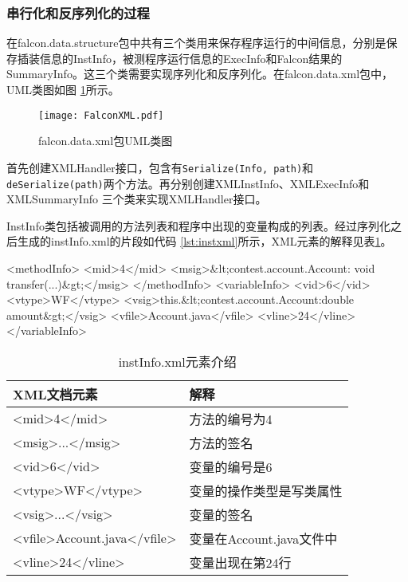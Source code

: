 \subsubsection{串行化和反序列化的过程}
在falcon.data.structure包中共有三个类用来保存程序运行的中间信息，分别是保存插装信息的InstInfo，被测程序运行信息的ExecInfo和Falcon结果的SummaryInfo。这三个类需要实现序列化和反序列化。在falcon.data.xml包中，UML类图如图
\ref{pic:FalconXML}所示。
\begin{figure}[!ht]
  \centering
  \texttt{[image: FalconXML.pdf]}\\
  \caption{falcon.data.xml包UML类图}\label{pic:FalconXML}
\end{figure}
首先创建XMLHandler接口，包含有\texttt{Serialize(Info, path)}和\texttt{deSerialize(path)}两个方法。再分别创建XMLInstInfo、XMLExecInfo和XMLSummaryInfo 三个类来实现XMLHandler接口。\par
InstInfo类包括被调用的方法列表和程序中出现的变量构成的列表。经过序列化之后生成的instInfo.xml的片段如代码
\ref{lst:instxml}所示，XML元素的解释见表\ref{tab:instXMLele}。\\
\begin{code}[language=XML, label=lst:instxml, caption=instInfo.xml片段]
<methodInfo>
 <mid>4</mid>
 <msig>&lt;contest.account.Account: void transfer(...)&gt;</msig>
</methodInfo>
<variableInfo>
 <vid>6</vid>
 <vtype>WF</vtype>
 <vsig>this.&lt;contest.account.Account:double amount&gt;</vsig>
 <vfile>Account.java</vfile>
 <vline>24</vline>
</variableInfo>
\end{code}
\begin{table}[!ht]
    \centering
    \caption{instInfo.xml元素介绍}\label{tab:instXMLele}
    \begin{tabular}{|l|l|}
      \hline
       XML文档元素 & 解释\\\hline
       <mid>4</mid> & 方法的编号为4\\\hline
       <msig>...</msig> & 方法的签名\\\hline
       <vid>6</vid> & 变量的编号是6\\\hline
       <vtype>WF</vtype> & 变量的操作类型是写类属性\\\hline
       <vsig>...</vsig> & 变量的签名\\\hline
       <vfile>Account.java</vfile> & 变量在Account.java文件中\\\hline
       <vline>24</vline> & 变量出现在第24行\\\hline
    \end{tabular}
\end{table}\par
